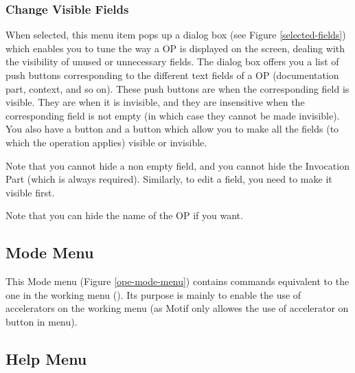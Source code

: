 \subsubsection{Change Visible Fields}


When selected, this menu item pops up a dialog box (see Figure
\ref{selected-fields}) which enables you to tune the way a OP is displayed
on the screen, dealing with the visibility of unused or unnecessary fields.
The dialog box offers you a list of push buttons corresponding to the
different text fields of a OP (documentation part, context, and so on).
These push buttons are  when the corresponding field is visible.
They are  when it is invisible, and they are insensitive when the
corresponding field is not empty (in which case they cannot be made
invisible). You also have a  button and a  button
which allow you to make all the fields (to which the operation applies)
visible or invisible.

Note that you cannot hide a non empty field, and you cannot hide the
Invocation Part (which is always required). Similarly, to edit a field,
you need to make it visible first.

Note that you can hide the name of the OP if you want.

\subsection{Mode Menu}


This Mode menu (Figure \ref{ope-mode-menu}) contains commands equivalent to the
one in the working menu (). Its purpose is mainly to
enable the use of accelerators on the working menu (as Motif only allowes the
use of accelerator on button in menu).

\subsection{\OPE{} Help Menu}


